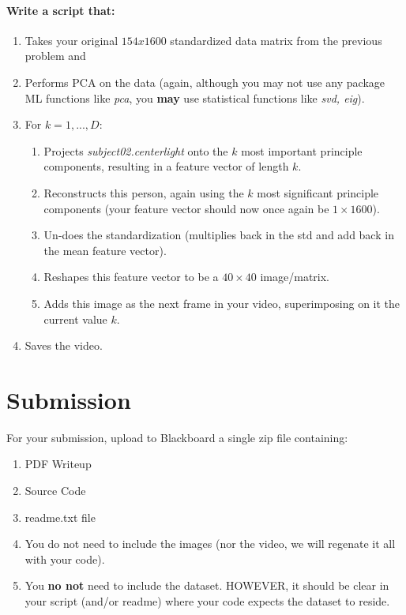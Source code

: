 \documentclass[12pt]{article}
\begin{document}
\paragraph{Write a script that:}
\begin{enumerate}
\item Takes your original $154x1600$ standardized data matrix from the previous problem and
  	\item Performs PCA on the data (again, although you may not use any package ML functions like \emph{pca}, you \textbf{may} use statistical functions like \emph{svd, eig}).
	\item For $k=1,...,D$:
	\begin{enumerate}
		\item Projects \emph{subject02.centerlight} onto the $k$ most important principle components, resulting in a feature vector of length $k$.  
	   \item Reconstructs this person, again using the $k$ most significant principle components (your feature vector should now once again be $1\times1600$).
		\item Un-does the standardization (multiplies back in the std and add back in the mean feature vector).
		\item Reshapes this feature vector to be a $40\times40$ image/matrix.
		\item Adds this image as the next frame in your video, superimposing on it the current value $k$.
	\end{enumerate}
\item Saves the video.
\end{enumerate}

\newpage
\section*{Submission}
For your submission, upload to Blackboard a single zip file containing:

\begin{enumerate}
\item PDF Writeup
\item Source Code
\item readme.txt file
\item You do not need to include the images (nor the video, we will regenate it all with your code).
\item You \textbf{no not} need to include the dataset.  HOWEVER, it should be clear in your script (and/or readme) where your code expects the dataset to reside.
\end{enumerate}
\end{document}
